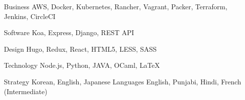 

\begin{cvskills}

  \cvskill
    {Business} %
    {AWS, Docker, Kubernetes, Rancher, Vagrant, Packer, Terraform, Jenkins, CircleCI} %

  \cvskill
    {Software} %
    {Koa, Express, Django, REST API} %

  \cvskill
    {Design} %
    {Hugo, Redux, React, HTML5, LESS, SASS} %

  \cvskill
    {Technology} %
    {Node.js, Python, JAVA, OCaml, LaTeX} %

  \cvskill
    {Strategy} %
    {Korean, English, Japanese} %
  \cvskill
    {Languages} %
    {English, Punjabi, Hindi, French (Intermediate)} %
\end{cvskills}
